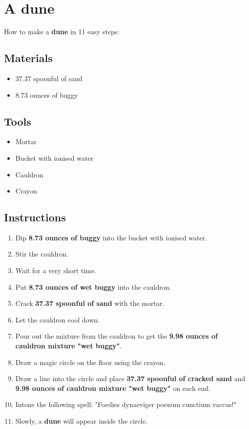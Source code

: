 \documentclass{article}
\begin{document}
\section{A dune}How to make a \textbf{dune} in 11 easy steps:

\subsection{Materials}\begin{itemize}
\item 
37.37 spoonful of sand
\item 
8.73 ounces of buggy
\end{itemize}
\subsection{Tools}\begin{itemize}
\item 
Mortar
\item 
Bucket with ionised water
\item 
Cauldron
\item 
Crayon
\end{itemize}
\subsection{Instructions}\begin{enumerate}
\item 
Dip \textbf{8.73 ounces of buggy} into the bucket with ionised water.
\item 
Stir the cauldron.
\item 
Wait for a very short time.
\item 
Put \textbf{8.73 ounces of wet buggy} into the cauldron.
\item 
Crack \textbf{37.37 spoonful of sand} with the mortar.
\item 
Let the cauldron cool down.
\item 
Pour out the mixture from the cauldron to get the \textbf{9.98 ounces of cauldron mixture "wet buggy"}.
\item 
Draw a magic circle on the floor using the crayon.
\item 
Draw a line into the circle and place \textbf{37.37 spoonful of cracked sand} and \textbf{9.98 ounces of cauldron mixture "wet buggy"} on each end.
\item 
Intone the following spell: "Foedies dynaeviger poenum cunctium vaccus!"
\item 
Slowly, a \textbf{dune} will appear inside the circle.
\end{enumerate}
\newpage
\end{document}
